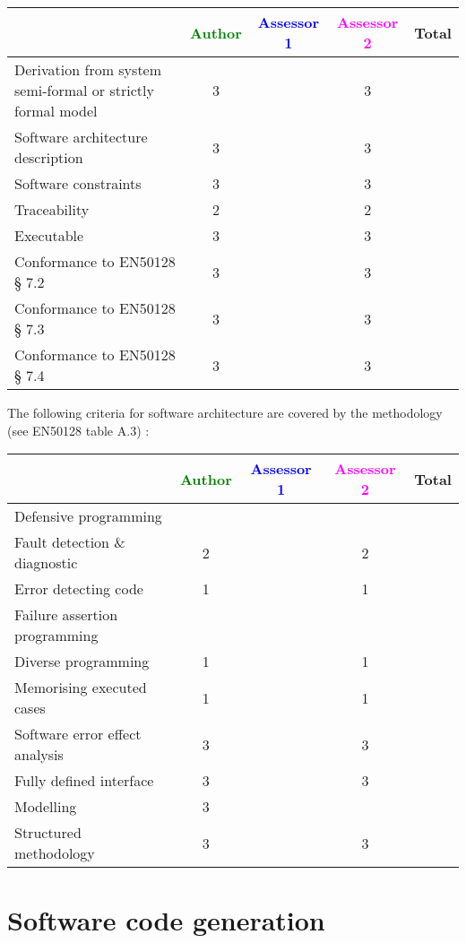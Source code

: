 \begin{tabular}{|l | c | c | c | c|}
\hline
& \textcolor{green}{Author} & \textcolor{blue}{Assessor 1} & \textcolor{magenta}{Assessor 2} & Total \\
\hline
Derivation from system semi-formal or strictly formal model  & 3 & & 3 &  \\
\hline 
Software architecture description  & 3 & & 3 &  \\
\hline
Software constraints  & 3 & & 3 &  \\
\hline
Traceability  & 2 & & 2 &  \\
\hline
Executable  & 3 & & 3 &  \\
\hline
Conformance to EN50128 § 7.2  & 3 & & 3 &  \\
\hline
Conformance to EN50128 § 7.3  & 3 & & 3 &  \\
\hline
Conformance to EN50128 § 7.4  & 3 & & 3 &  \\
\hline
\end{tabular}

The following criteria for software architecture are covered by the methodology
(see EN50128 table A.3) :

\begin{tabular}{|l | c | c | c | c|}
\hline
& \textcolor{green}{Author} & \textcolor{blue}{Assessor 1} & \textcolor{magenta}{Assessor 2} & Total \\
\hline
Defensive programming  & & & &  \\
\hline 
Fault detection \& diagnostic  & 2 & & 2 &  \\
\hline
Error detecting code  & 1 & & 1 &  \\
\hline
Failure assertion programming & & & &  \\
\hline
Diverse programming & 1 & & 1 &  \\
\hline
Memorising executed cases & 1 & & 1 &  \\
\hline
Software error effect analysis & 3 & & 3 &  \\
\hline
Fully defined interface & 3 & & 3 &  \\
\hline
Modelling  & 3 & & &  \\
\hline
Structured methodology & 3 & & 3 &  \\
\hline
\end{tabular}

\section{Software code generation}

